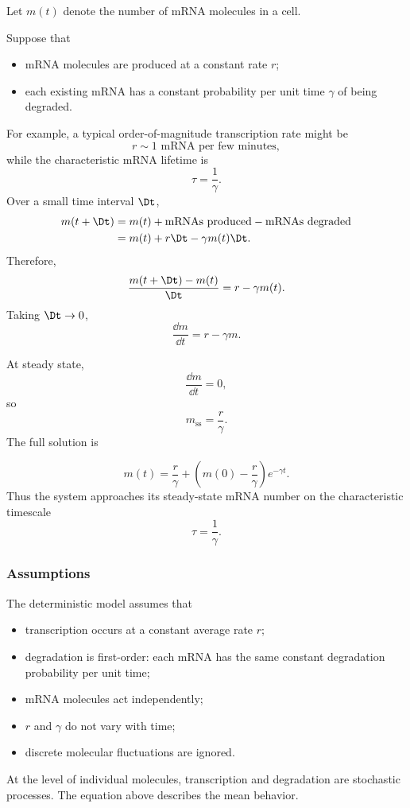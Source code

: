 Let $m(t)$ denote the number of mRNA molecules in a cell.

Suppose that
\begin{itemize}
    \item mRNA molecules are produced at a constant rate $r$;
    \item each existing mRNA has a constant probability per unit time $\gamma$ of being degraded.
\end{itemize}

For example, a typical order-of-magnitude transcription rate might be
\[
    r \sim 1 \text{ mRNA per few minutes},
\]
while the characteristic mRNA lifetime is
\[
    \tau = \frac{1}{\gamma}.
\]
Over a small time interval $\Dt$,
\begin{align*}
    m(t+\Dt) &= m(t) + \text{mRNAs produced} - \text{mRNAs degraded}
    \\
    &= m(t) + r\Dt - \gamma m(t)\Dt.
\end{align*}
Therefore,
\[
    \frac{m(t+\Dt)-m(t)}{\Dt} = r-\gamma m(t).
\]
Taking $\Dt \rightarrow 0$,
\[
    \frac{\dd m}{\dd t} = r-\gamma m.
\]

At steady state,
\[
    \frac{\dd m}{\dd t}=0,
\]
so
\[
    m_{\mathrm{ss}} = \frac{r}{\gamma}.
\]
The full solution is

\[
    m(t) = \frac{r}{\gamma} + \left( m(0)-\frac{r}{\gamma} \right) e^{-\gamma t}.
\]
Thus the system approaches its steady-state mRNA number on the characteristic timescale
\[
    \tau = \frac{1}{\gamma}.
\]

\subsubsection*{Assumptions}

The deterministic model assumes that

\begin{itemize}
    \item transcription occurs at a constant average rate $r$;
    \item degradation is first-order: each mRNA has the same constant degradation probability per unit time;
    \item mRNA molecules act independently;
    \item $r$ and $\gamma$ do not vary with time;
    \item discrete molecular fluctuations are ignored.
\end{itemize}

At the level of individual molecules, transcription and degradation are
stochastic processes. The equation above describes the mean behavior.

